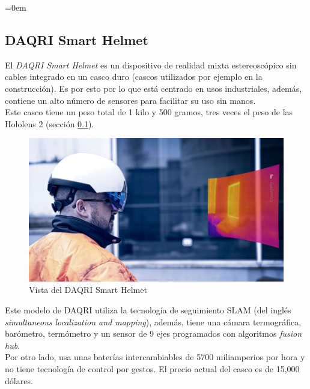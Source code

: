\parindent=0em
\subsection{DAQRI Smart Helmet}
\label{HoloLens2Dispositivo}
\noindent


El \textit{DAQRI Smart Helmet} es un dispositivo de realidad mixta estereoscópico sin cables integrado en un casco duro (cascos utilizados por ejemplo en la construcción). Es por esto por lo que está centrado en usos industriales, además, contiene un alto número de sensores para facilitar su uso sin manos.\\

Este casco tiene un peso total de 1 kilo y 500 gramos, tres veces el peso de las Hololens 2 (sección {\ref{HoloLens2Dispositivo}}).


\begin{figure}[h]
    \centering
    \includegraphics[scale=0.12]{Images/Estado del arte/daqrihelmet.jpg}
    \caption{Vista del DAQRI Smart Helmet}
    \label{fig:vistaDAQRIHelmet}
\end{figure}

Este modelo de DAQRI utiliza la tecnología de seguimiento SLAM (del inglés \textit{simultaneous localization and mapping}), además, tiene una cámara termográfica, barómetro, termómetro y un sensor de 9 ejes programados con algoritmos \textit{fusion hub}.\\

Por otro lado, usa unas baterías intercambiables de 5700 miliamperios por hora y no tiene tecnología de control por gestos. El precio actual del casco es de 15,000 dólares.





